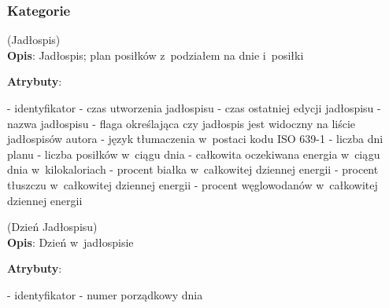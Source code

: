 \subsubsection{Kategorie}\label{subsubsec:database:mealplans:categories}
\begin{enumerate}[label={\textbf{KAT/4/\protect\twodigits{\theenumi}}}, wide, labelwidth=!, labelindent=0pt, labelsep=0pt, series=reqs]
    \setlength\itemsep{1.75em}
    \label{kat:MealPlan} (Jadłospis)\\
    \indent\textbf{Opis}: Jadłospis; plan posiłków z~podziałem na dnie i~posiłki
    \par
    \textbf{Atrybuty}:
    \begin{itemize}[series=atr, wide, align=left, leftmargin=190pt]
        \label{kat:MealPlan:id}- identyfikator
        \label{kat:MealPlan:creationTimestamp}- czas utworzenia jadłospisu
        \label{kat:MealPlan:editTimestamp}- czas ostatniej edycji jadłospisu
        \label{kat:MealPlan:name}- nazwa jadłospisu
        \label{kat:MealPlan:isVisible}- flaga określająca czy jadłospis jest widoczny na liście jadłospisów autora
        \label{kat:MealPlan:language}- język tłumaczenia w~postaci kodu ISO 639-1
        \label{kat:MealPlan:numberOfDays}- liczba dni planu
        \label{kat:MealPlan:numberOfMealsPerDay}- liczba posiłków w~ciągu dnia
        \label{kat:MealPlan:totalDailyEnergy}- całkowita oczekiwana energia w~ciągu dnia w~kilokaloriach
        \label{kat:MealPlan:percentOfProtein}- procent białka w~całkowitej dziennej energii
        \label{kat:MealPlan:percentOfFat}- procent tłuszczu w~całkowitej dziennej energii
        \label{kat:MealPlan:percentOfCarbohydrates}- procent węglowodanów w~całkowitej dziennej energii
    \end{itemize}

    \label{kat:MealPlanDay} (Dzień Jadłospisu)\\
    \indent\textbf{Opis}: Dzień w~jadłospisie
    \par
    \textbf{Atrybuty}:
    \begin{itemize}[series=atr, wide, align=left, leftmargin=190pt]
        \label{kat:MealPlanDay:id}- identyfikator
        \label{kat:MealPlanDay:ordinalNumber}- numer porządkowy dnia
    \end{itemize}


\end{enumerate}
